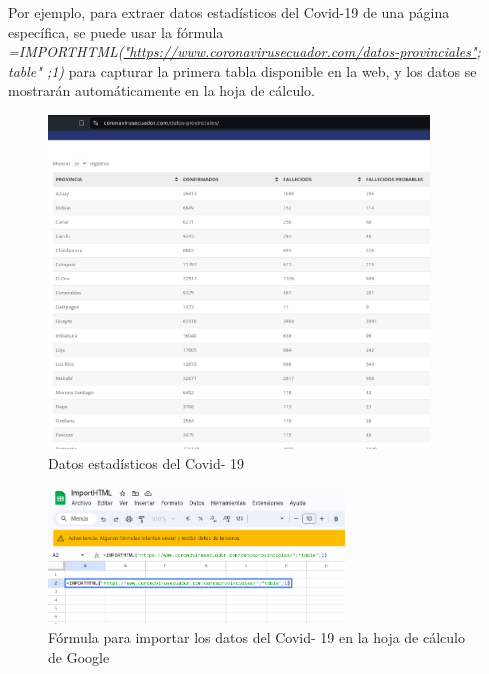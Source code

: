\documentclass[12pt]{article}
\begin{document}
                        Por ejemplo, para extraer datos estadísticos del Covid-19 de una página específica, se puede usar la fórmula \textit{=IMPORTHTML(\href{https://www.coronavirusecuador.com/datos-provinciales/}{"https://www.coronavirusecuador.com/datos-provinciales"}; table" ;1)} para capturar la primera tabla disponible en la web, y los datos se mostrarán automáticamente en la hoja de cálculo.

                        \begin{figure}[!h]
                                \centering
                                \includegraphics[width=0.9\textwidth]{img/importhtml-1.png}
                                \caption{Datos estadísticos del Covid- 19}
                        \end{figure}

                        \newpage
                        \begin{figure}[!h]
                                \centering
                                \includegraphics[width=0.7\textwidth]{img/importhtml-2.png}
                                \caption{Fórmula para importar los datos del Covid- 19 en la hoja de cálculo de Google}
                        \end{figure}
\end{document}
